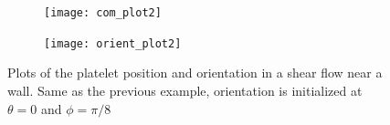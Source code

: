 \documentclass{article}
\begin{document}
\begin{figure}
  \centering
  \begin{subfigure}{0.49\textwidth}
    \texttt{[image: com\_plot2]}
  \end{subfigure}
  \hfill
  \begin{subfigure}{0.49\textwidth}
    \texttt{[image: orient\_plot2]}
  \end{subfigure}
  \caption{Plots of the platelet position and orientation in a shear
    flow near a wall. Same as the previous example, orientation is
    initialized at $\theta = 0$ and $\phi = \pi/8$}
  \label{fig:com_plot2}
\end{figure}



\end{document}
